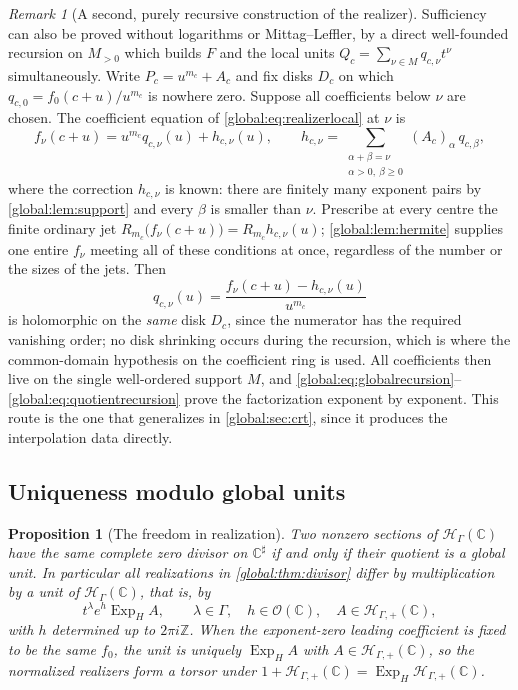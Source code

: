 \documentclass[11pt,letterpaper]{article}
\newtheorem{proposition}[proposition]{Proposition}
\theoremstyle{definition}
\theoremstyle{remark}
\newtheorem{remark}[remark]{Remark}
\newcommand{\C}{\mathbb C}
\newcommand{\Z}{\mathbb Z}
\newcommand{\OO}{\mathcal O}
\newcommand{\HH}{\mathscr H_\Gamma}
\newcommand{\HP}{\mathscr H_{\Gamma,+}}
\newcommand{\sh}{^{\sharp}}
\newcommand{\ExpH}{\operatorname{Exp}_{H}}
\numberwithin{equation}{section}
\begin{document}
\begin{remark}[A second, purely recursive construction of the realizer]\label{global:rem:secondproof}
Sufficiency can also be proved without logarithms or Mittag--Leffler, by a direct well-founded recursion on $M_{>0}$ which builds $F$ and the local units $Q_c=\sum_{\nu\in M}q_{c,\nu}t^\nu$ simultaneously. Write $P_c=u^{m_c}+A_c$ and fix disks $D_c$ on which $q_{c,0}=f_0(c+u)/u^{m_c}$ is nowhere zero. Suppose all coefficients below $\nu$ are chosen. The coefficient equation of \eqref{global:eq:realizerlocal} at $\nu$ is
\begin{equation}\label{global:eq:globalrecursion}
  f_\nu(c+u)=u^{m_c}q_{c,\nu}(u)+h_{c,\nu}(u),
  \qquad
  h_{c,\nu}=\sum_{\substack{\alpha+\beta=\nu\\ \alpha>0,\ \beta\ge0}}(A_c)_\alpha\,q_{c,\beta},
\end{equation}
where the correction $h_{c,\nu}$ is known: there are finitely many exponent pairs by \cref{global:lem:support} and every $\beta$ is smaller than $\nu$. Prescribe at every centre the finite ordinary jet $R_{m_c}\bigl(f_\nu(c+u)\bigr)=R_{m_c}h_{c,\nu}(u)$; \cref{global:lem:hermite} supplies one entire $f_\nu$ meeting all of these conditions at once, regardless of the number or the sizes of the jets. Then
\begin{equation}\label{global:eq:quotientrecursion}
  q_{c,\nu}(u)=\frac{f_\nu(c+u)-h_{c,\nu}(u)}{u^{m_c}}
\end{equation}
is holomorphic on the \emph{same} disk $D_c$, since the numerator has the required vanishing order; no disk shrinking occurs during the recursion, which is where the common-domain hypothesis on the coefficient ring is used. All coefficients then live on the single well-ordered support $M$, and \eqref{global:eq:globalrecursion}--\eqref{global:eq:quotientrecursion} prove the factorization exponent by exponent. This route is the one that generalizes in \cref{global:sec:crt}, since it produces the interpolation data directly.
\end{remark}

\subsection{Uniqueness modulo global units}

\begin{proposition}[The freedom in realization]\label{global:prop:realizationtorsor}
Two nonzero sections of $\HH(\C)$ have the same complete zero divisor on $\C\sh$ if and only if their quotient is a global unit. In particular all realizations in \cref{global:thm:divisor} differ by multiplication by a unit of $\HH(\C)$, that is, by
\[
  t^\lambda e^{h}\ExpH A,
  \qquad \lambda\in\Gamma,\quad h\in\OO(\C),\quad A\in\HP(\C),
\]
with $h$ determined up to $2\pi i\Z$. When the exponent-zero leading coefficient is fixed to be the same $f_0$, the unit is uniquely $\ExpH A$ with $A\in\HP(\C)$, so the normalized realizers form a torsor under $1+\HP(\C)=\ExpH\HP(\C)$.
\end{proposition}
\end{document}
